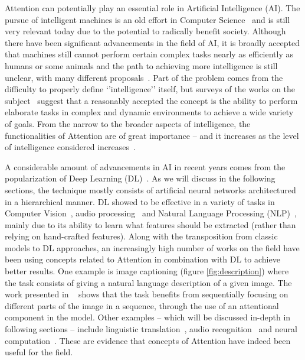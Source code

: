 \documentclass[12pt]{article}
\begin{document}
Attention can potentially play an essential role in Artificial Intelligence (AI).
The pursue of intelligent machines is an old effort in Computer Science~\cite{ref:turing} and is still very
relevant today due to the potential to radically benefit society.
Although there have been significant advancements in the field of AI, it is broadly accepted that
machines still cannot perform certain complex tasks nearly as efficiently as humans or some animals and
the path to achieving more intelligence is still unclear, with many different proposals~\cite{ref:mikolov}.
Part of the problem comes from the difficulty to properly define `'intelligence'' itself, but
surveys of the works on the subject~\cite{ref:aidef} suggest that a reasonably accepted
the concept is the ability to perform elaborate tasks in complex and dynamic environments
to achieve a wide variety of goals.
From the narrow to the broader aspects of intelligence, the functionalities of Attention
are of great importance -- and it increases
as the level of intelligence considered increases~\cite{ref:helgason}.

A considerable amount of advancements in AI in recent years comes from
the popularization of Deep Learning (DL)~\cite{ref:dl}.
As we will discuss in the following sections, the technique mostly consists of
artificial neural networks architectured in a hierarchical manner.
DL showed to be effective in a variety of tasks in Computer Vision~\cite{ref:imagenet}\cite{ref:segmentation},
audio processing~\cite{ref:wavenet} and Natural Language
Processing (NLP)~\cite{ref:att-all-you-need}, mainly due to its ability
to learn what features should be extracted (rather than relying on hand-crafted features).
Along with the transposition from classic models to DL
approaches, an increasingly high number of works on the field
have been using concepts related to Attention in combination with DL to achieve better results.
One example is image captioning (figure \ref{fig:description}) where the task
consists of giving a natural language description of a given image.
The work presented in ~\cite{ref:img-captioning} shows that the task benefits from
sequentially focusing on different parts of the image in a sequence,
through the use of an attentional component in the model.
Other examples -- which will be discussed in-depth in following sections -- include linguistic
translation~\cite{ref:translation}, audio recognition~\cite{ref:audio} and neural computation~\cite{ref:ntm}.
These are evidence that concepts of Attention have indeed been useful for the field.
\end{document}
